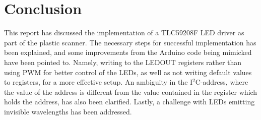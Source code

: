 \documentclass[12pt, a4paper]{article}
\begin{document}
    

\section{Conclusion}
    This report has discussed the implementation of a TLC59208F LED driver as part of the plastic scanner.
    The necessary steps for successful implementation has been explained, and some improvements from the Arduino code being mimicked \cite{arduinocode}
    have been pointed to. Namely, writing to the LEDOUT registers rather than using PWM for better control of the LEDs, as well as not
    writing default values to registers, for a more effective setup. An ambiguity in the I$^2$C-address, where the value of the address is
    different from the value contained in the register which holds the address, has also been clarified. Lastly, a challenge with LEDs emitting invisible
    wavelengths has been addressed.

    \clearpage
    
    
\end{document}

